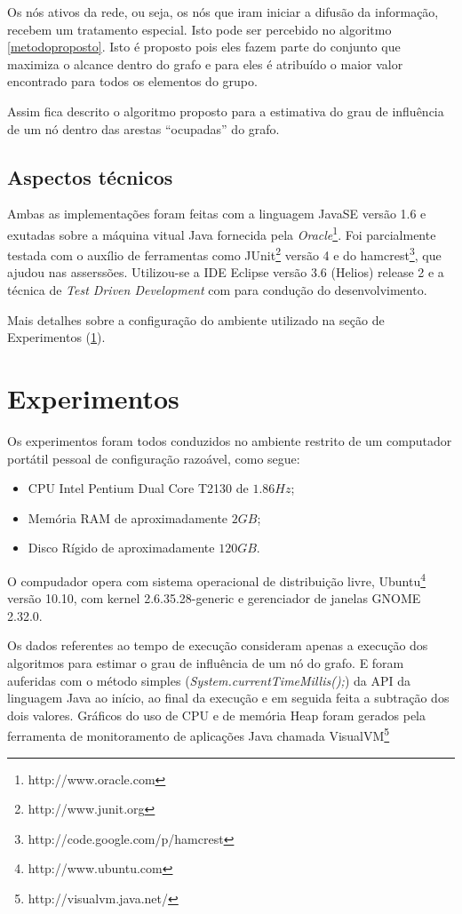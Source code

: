 \documentclass{acm_proc_article-sp}
\begin{document}
Os nós ativos da rede, ou seja, os nós que iram iniciar a difusão da informação, recebem um tratamento especial.
Isto pode ser percebido no algoritmo \ref{metodoproposto}. Isto é proposto pois eles fazem parte do conjunto que
maximiza o alcance dentro do grafo e para eles é atribuído o maior valor encontrado para todos os elementos do grupo.

Assim fica descrito o algoritmo proposto para a estimativa do grau de influência de um nó dentro das arestas
``ocupadas'' do grafo.

\subsection{Aspectos técnicos}
Ambas as implementações foram feitas com a linguagem JavaSE versão 1.6 e exutadas sobre a máquina vitual Java
fornecida pela \textit{Oracle}\footnote{http://www.oracle.com}. Foi parcialmente testada com o auxílio de ferramentas como
JUnit\footnote{http://www.junit.org} versão 4 e do hamcrest\footnote{http://code.google.com/p/hamcrest}, que ajudou
nas asserssões. Utilizou-se a IDE Eclipse versão 3.6 (Helios) release 2 e a técnica de \textit{Test Driven
Development} com para condução do desenvolvimento.

Mais detalhes sobre a configuração do ambiente utilizado na seção de Experimentos (\ref{experimentos}).

\section{Experimentos}\label{experimentos}
Os experimentos foram todos conduzidos no ambiente restrito de um computador portátil pessoal de configuração
razoável, como segue:

\begin{itemize}
  \item CPU Intel Pentium Dual Core T2130 de $1.86 Hz$;
  \item Memória RAM de aproximadamente $2 GB$; 
  \item Disco Rígido de aproximadamente $120 GB$.
\end{itemize}

O compudador opera com sistema operacional de distribuição livre, Ubuntu\footnote{http://www.ubuntu.com} versão
10.10, com kernel 2.6.35.28-generic e gerenciador de janelas GNOME 2.32.0. 

Os dados referentes ao tempo de execução consideram apenas a execução dos algoritmos para estimar o grau de
influência de um nó do grafo. E foram auferidas com o método simples (\textit{System.currentTimeMillis();})
da API da linguagem Java ao início, ao final da execução e em seguida feita a subtração dos dois valores. Gráficos
do uso de CPU e de memória Heap foram gerados pela ferramenta de monitoramento de aplicações Java chamada
VisualVM\footnote{http://visualvm.java.net/}
\end{document}
